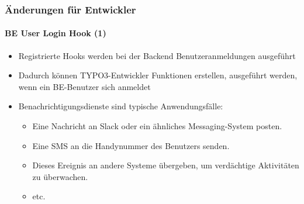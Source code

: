 
\begin{frame}[fragile]
	\frametitle{Änderungen für Entwickler}
	\framesubtitle{BE User Login Hook (1)}

	\lstset{basicstyle=\tiny\ttfamily}

	\begin{itemize}
		\item Registrierte Hooks werden bei der Backend Benutzeranmeldungen ausgeführt
		\item Dadurch können TYPO3-Entwickler Funktionen erstellen, ausgeführt
			 werden, wenn ein BE-Benutzer sich anmeldet

		\item Benachrichtigungsdienste sind typische Anwendungsfälle:

			\begin{itemize}
				\item Eine Nachricht an Slack oder ein ähnliches Messaging-System posten.
				\item Eine SMS an die Handynummer des Benutzers senden.
				\item Dieses Ereignis an andere Systeme übergeben, um verdächtige
					Aktivitäten zu überwachen.
				\item etc.
			\end{itemize}

	\end{itemize}

\end{frame}


